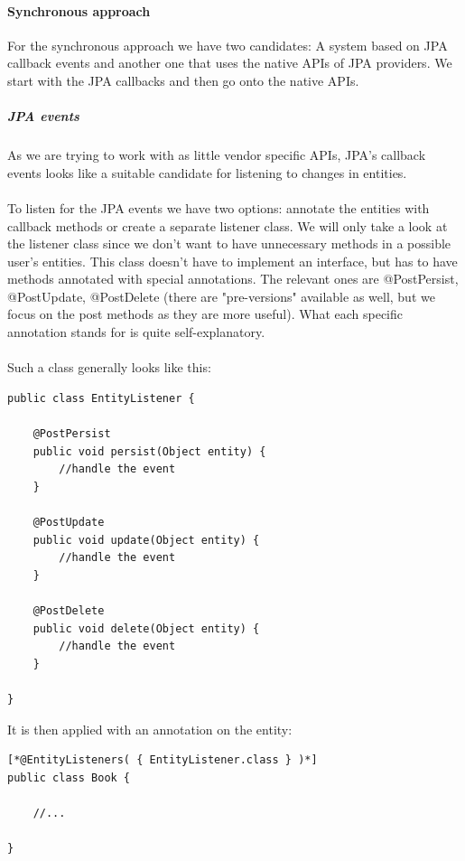 \pagebreak

\paragraph{Synchronous approach}

For the synchronous approach we have two candidates: A system based on JPA callback events and another one that uses the native APIs of JPA providers. We start with the JPA callbacks and then go onto the native APIs.

\subparagraph{JPA events}

As we are trying to work with as little vendor specific APIs, JPA's callback events looks like a suitable candidate for listening to changes in entities.
\\\\
To listen for the JPA events we have two options: annotate the entities with callback methods or create a separate listener class. We will only take a look at the listener class since we don't want to have unnecessary methods in a possible user's entities. This class doesn't have to implement an interface, but has to have methods annotated with special annotations. The relevant ones are @PostPersist, @PostUpdate, @PostDelete (there are "pre-versions" available as well, but we focus on the post methods as they are more useful). What each specific annotation stands for is quite self-explanatory.
\\\\
Such a class generally looks like this:
\\
\lstset{language=java}
\begin{lstlisting}[frame=htrbl, caption={Example JPA entity listener}, label={lst:jpa_entity_listener.java}]
public class EntityListener {

	@PostPersist
	public void persist(Object entity) {
		//handle the event
	}
	
	@PostUpdate
	public void update(Object entity) {
		//handle the event
	}
	
	@PostDelete
	public void delete(Object entity) {
		//handle the event
	}

}
\end{lstlisting}
\noindent
It is then applied with an annotation on the entity:
\\
\lstset{language=java}
\begin{lstlisting}[frame=htrbl, caption={Using a JPA entity listener}, label={lst:using_jpa_entitylisteners.java}]
[*@EntityListeners( { EntityListener.class } )*]
public class Book {

	//...

}
\end{lstlisting}
